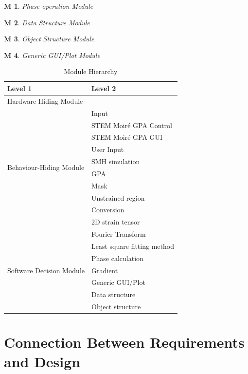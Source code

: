 \documentclass[12pt, titlepage]{article}
\newcommand{\progname}{STEM Moir{\'e} GPA}
\newtheorem{M}{M}
\begin{document}
\begin{M}\normalfont Phase operation Module
\label{M_Phase}
\end{M}

\begin{M}\normalfont Data Structure Module
\label{M_DataStruct}
\end{M}

\begin{M}\normalfont Object Structure Module
\label{M_ObjectStruct}
\end{M}

\begin{M}\normalfont Generic GUI/Plot Module
\label{M_GUIGene}
\end{M}

\begin{table}[H]
\centering
\begin{tabular}{p{} p{}}
\toprule
\textbf{Level 1} & \textbf{Level 2}\\
\midrule

{Hardware-Hiding Module} & ~ \\
\midrule

\multirow{10}{0.3\textwidth}{Behaviour-Hiding Module} & Input\\
& \progname{} Control \\
& \progname{} GUI \\
& User Input \\
& SMH simulation \\
& GPA \\
& Mask \\
& Unstrained region \\
& Conversion \\
& 2D strain tensor \\
\midrule

\multirow{7}{0.3\textwidth}{Software Decision Module} & Fourier Transform \\
& Least square fitting method \\
& Phase calculation \\
& Gradient \\
& Generic GUI/Plot \\
& Data structure \\
& Object structure \\
\bottomrule

\end{tabular}
\caption{Module Hierarchy}
\label{TblMH}
\end{table}

\section{Connection Between Requirements and Design} \label{SecConnection}
\end{document}
